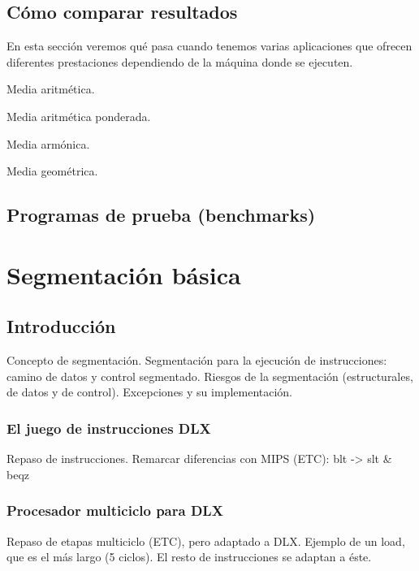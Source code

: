 \documentclass[12pt,onecolumn]{memoir}
\begin{document}
\section{Cómo comparar resultados}

En esta sección veremos qué pasa cuando tenemos varias aplicaciones
que ofrecen diferentes prestaciones dependiendo de la máquina donde se
ejecuten.

Media aritmética.

Media aritmética ponderada.

Media armónica.

Media geométrica.

\section{Programas de prueba (benchmarks)}



\chapter{Segmentación básica}
\label{cap:segmentado}


\section{Introducción}
\label{sec:introduccion_segmentado}

Concepto de segmentación. Segmentación para la ejecución de
instrucciones: camino de datos y control segmentado. Riesgos de la
segmentación (estructurales, de datos y de control). Excepciones y su
implementación.

\subsection{El juego de instrucciones DLX}

Repaso de instrucciones. Remarcar diferencias con MIPS (ETC): blt -> slt \& beqz

\subsection{Procesador multiciclo para DLX}

Repaso de etapas multiciclo (ETC), pero adaptado a DLX. Ejemplo de
un load, que es el más largo (5 ciclos). El resto de instrucciones se adaptan a éste. 
\end{document}
